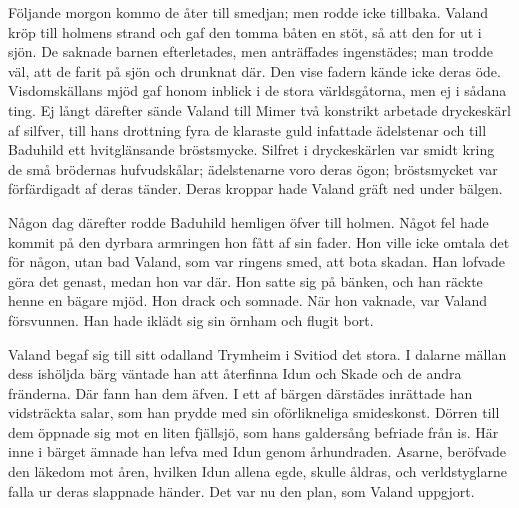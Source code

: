 Följande morgon kommo de åter till smedjan; men rodde icke tillbaka.
Valand kröp till holmens strand och gaf den tomma båten en stöt, så att
den for ut i sjön. De saknade barnen efterletades, men anträffades
ingenstädes; man trodde väl, att de farit på sjön och drunknat där. Den
vise fadern kände icke deras öde. Visdomskällans mjöd gaf honom inblick
i de stora världsgåtorna, men ej i sådana ting. Ej långt därefter sände
Valand till Mimer två konstrikt arbetade dryckeskärl af silfver, till
hans drottning fyra de klaraste guld infattade ädelstenar och till
Baduhild ett hvitglänsande bröstsmycke. Silfret i dryckeskärlen var
smidt kring de små brödernas hufvudskålar; ädelstenarne voro deras ögon;
bröstsmycket var förfärdigadt af deras tänder. Deras kroppar hade Valand
gräft ned under bälgen.

Någon dag därefter rodde Baduhild hemligen öfver till holmen. Något fel
hade kommit på den dyrbara armringen hon fått af sin fader. Hon ville
icke omtala det för någon, utan bad Valand, som var ringens smed, att
bota skadan. Han lofvade göra det genast, medan hon var där. Hon satte
sig på bänken, och han räckte henne en bägare mjöd. Hon drack och
somnade. När hon vaknade, var Valand försvunnen. Han hade iklädt sig sin
örnham och flugit bort.

Valand begaf sig till sitt odalland Trymheim i Svitiod det stora. I
dalarne mällan dess ishöljda bärg väntade han att återfinna Idun och
Skade och de andra fränderna. Där fann han dem äfven. I ett af bärgen
därstädes inrättade han vidsträckta salar, som han prydde med sin
oförlikneliga smideskonst. Dörren till dem öppnade sig mot en liten
fjällsjö, som hans galdersång befriade från is. Här inne i bärget ämnade
han lefva med Idun genom århundraden. Asarne, beröfvade den läkedom mot
åren, hvilken Idun allena egde, skulle åldras, och verldstyglarne falla
ur deras slappnade händer. Det var nu den plan, som Valand uppgjort.

